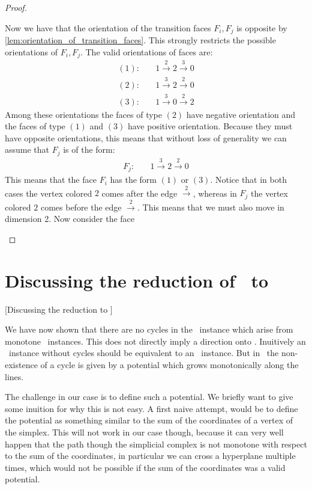 \begin{proof}
\begin{case}{1}
		Now we have that the orientation of the transition faces $F_i, F_j$ is opposite by \cref{lem:orientation_of_transition_faces}. This strongly restricts the possible orientations of $F_i, F_j$. The valid orientations of faces are:
		\begin{align*}
			(1): \quad & 1 \xrightarrow{2} 2 \xrightarrow{3} 0 \\
			(2): \quad & 1 \xrightarrow{3} 2 \xrightarrow{2} 0 \\
			(3): \quad & 1 \xrightarrow{3} 0 \xrightarrow{2} 2
		\end{align*}
		Among these orientations the faces of type $(2)$ have negative orientation and the faces of type $(1)$ and $(3)$ have positive orientation. Because they must have opposite orientations, this means that without loss of generality we can assume that $F_j$ is of the form:
		\begin{align*}
			F_j: \quad & 1 \xrightarrow{3} 2 \xrightarrow{2} 0
		\end{align*}
		This means that the face $F_i$ has the form $(1)$ or $(3)$. Notice that in both cases the vertex colored $2$ comes after the edge $\xrightarrow{2}$, whereas in $F_j$ the vertex colored $2$ comes before the edge $\xrightarrow{2}$. This means that we must also move in dimension 2. Now consider the face
	\end{case}
\end{proof}

\section{Discussing the reduction of \Tarskistar\ to \EndOfPotentialLine}[Discussing the reduction to \EOPL]

We have now shown that there are no cycles in the \EndOfLine\ instance which arise from monotone \Tarskistar\ instances. This does not directly imply a direction onto \EndOfPotentialLine. Inuitively an \EndOfLine\ instance without cycles should be equivalent to an \EndOfPotentialLine\ instance. But in \EndOfPotentialLine\ the non-existence of a cycle is given by a potential which grows monotonically along the lines.

The challenge in our case is to define such a potential. We briefly want to give some inuition for why this is not easy. A first naive attempt, would be to define the potential as something similar to the sum of the coordinates of a vertex of the simplex. This will not work in our case though, because it can very well happen that the path though the simplicial complex is not monotone with respect to the sum of the coordinates, in particular we can cross a hyperplane multiple times, which would not be possible if the sum of the coordinates was a valid potential.

